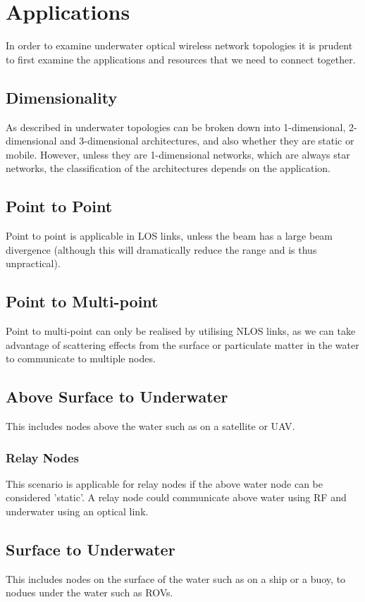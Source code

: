 \section{Applications}
In order to examine underwater optical wireless network topologies
it is prudent to first examine the applications and resources that
we need to connect together.

\subsection{Dimensionality}
As described in \cite{saeed2018underwater} underwater topologies can be broken
down into 1-dimensional, 2-dimensional and 3-dimensional architectures, and also
whether they are static or mobile. However, unless they are 1-dimensional
networks, which are always star networks, the classification of the
architectures depends on the application.

\subsection{Point to Point}
Point to point is applicable in \ac{LOS} links, unless the beam has a large
beam divergence (although this will dramatically reduce the range and is
thus unpractical).

\subsection{Point to Multi-point}
Point to multi-point can only be realised by utilising \ac{NLOS} links, as
we can take advantage of scattering effects from the surface or particulate
matter in the water to communicate to multiple nodes.

\subsection{Above Surface to Underwater}
This includes nodes above the water such as on a satellite or \ac{UAV}.

\subsubsection{Relay Nodes}
This scenario is applicable for relay nodes if the above water node
can be considered 'static'. A relay node could communicate above water
using RF and underwater using an optical link.

\subsection{Surface to Underwater}
This includes nodes on the surface of the water such as on a ship
or a buoy, to nodues under the water such as \ac{ROV}s.

